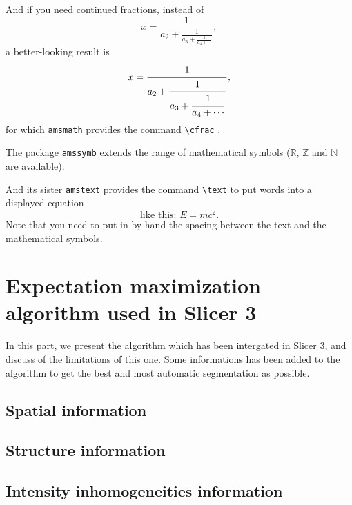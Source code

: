 And if you need continued fractions, instead of 
\[x=\frac{1}{a_2+\frac{1}{a_3+\frac{1}{a_4+\cdots}}},\]a better-looking
result
is\[x=\frac{\strut1}{\displaystyle a_2+\frac{\strut1}{\displaystyle
a_3+\frac{\strut1}{\displaystyle a_4+\cdots}}},\]for which
\texttt{amsmath}
provides the command \verb+\cfrac+ \cite[Sec.~8.4.2]{MG}.
\par
The package \texttt{amssymb} \cite[Chap.~8]{MG} extends the range of
mathematical symbols (\eg\(\mathbb{R}\), \(\mathbb{Z}\) and
\(\mathbb{N}\) are available).
\par
And its sister \texttt{amstext} provides the command \verb+\text+ to
put words into a displayed equation \[ \text{like this: }E=mc^2. \]Note
that you need to put in by hand the spacing between the text and the
mathematical symbols.
%
\section{Expectation maximization algorithm used in Slicer 3}\label{angels}
In this part, we present the algorithm which has been intergated in Slicer 3, and discuss of the limitations of this one. Some informations has been added to the algorithm to get the best and most automatic segmentation as possible.
%
\subsection{Spatial information}
%
\subsection{Structure information}
%
\subsection{Intensity inhomogeneities information}
%
